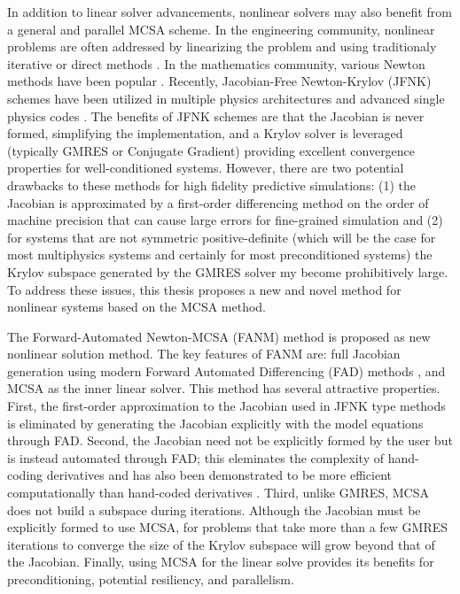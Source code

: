 \documentclass[letterpaper,12pt]{article}
\begin{document}
In addition to linear solver advancements, nonlinear solvers may also
benefit from a general and parallel MCSA scheme. In the engineering
community, nonlinear problems are often addressed by linearizing the
problem and using traditionaly iterative or direct methods
\cite{Tannehill_1997}. In the mathematics community, various Newton
methods have been popular \cite{Kelley_1995}. Recently, Jacobian-Free
Newton-Krylov (JFNK) schemes have been utilized in multiple physics
architectures and advanced single physics codes \cite{Knoll_2004,
  Gaston_2009}. The benefits of JFNK schemes are that the Jacobian is
never formed, simplifying the implementation, and a Krylov solver is
leveraged (typically GMRES or Conjugate Gradient) providing excellent
convergence properties for well-conditioned systems. However, there
are two potential drawbacks to these methods for high fidelity
predictive simulations: (1) the Jacobian is approximated by a
first-order differencing method on the order of machine precision that
can cause large errors for fine-grained simulation and (2) for systems
that are not symmetric positive-definite (which will be the case for
most multiphysics systems and certainly for most preconditioned
systems) the Krylov subspace generated by the GMRES solver my become
prohibitively large. To address these issues, this thesis proposes a
new and novel method for nonlinear systems based on the MCSA method.

The Forward-Automated Newton-MCSA (FANM) method is proposed as new
nonlinear solution method. The key features of FANM are: full Jacobian
generation using modern Forward Automated Differencing (FAD) methods
\cite{Bartlett_2006}, and MCSA as the inner linear solver. This method
has several attractive properties. First, the first-order
approximation to the Jacobian used in JFNK type methods is eliminated
by generating the Jacobian explicitly with the model equations through
FAD. Second, the Jacobian need not be explicitly formed by the user
but is instead automated through FAD; this eleminates the complexity
of hand-coding derivatives and has also been demonstrated to be more
efficient computationally than hand-coded derivatives
\cite{Bartlett_2006}. Third, unlike GMRES, MCSA does not build a
subspace during iterations. Although the Jacobian must be explicitly
formed to use MCSA, for problems that take more than a few GMRES
iterations to converge the size of the Krylov subspace will grow
beyond that of the Jacobian. Finally, using MCSA for the linear solve
provides its benefits for preconditioning, potential resiliency, and
parallelism.
\end{document}
